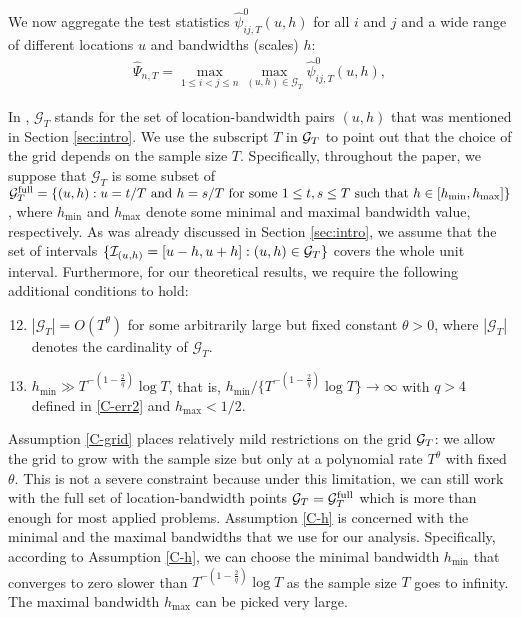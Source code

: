 \documentclass[a4paper,12pt]{article}
\makeatletter
\renewcommand{\eqref}[1]{\tagform@{\ref{#1}}}
\makeatother
\begin{document}
We now aggregate the test statistics $\hat{\psi}^0_{ij, T}(u,h)$ for all $i$ and $j$ and a wide range of different locations $u$ and bandwidths (scales) $h$:
\begin{align}\label{eq:Psi_hat}
	\widehat{\Psi}_{n,T} = \max_{1 \le i < j \le n}\max_{(u,h) \in \mathcal{G}_T} \hat{\psi}^0_{ij,T}(u, h),
\end{align}

In \eqref{eq:Psi_hat}, $\mathcal{G}_T$ stands for the set of location-bandwidth pairs $(u, h)$ that was mentioned in Section \ref{sec:intro}. We use the subscript $T$ in $\mathcal{G}_T$ to point out that the choice of the grid depends on the sample size $T$. Specifically, throughout the paper, we suppose that $\mathcal{G}_T$ is some subset of $\mathcal{G}_T^{\text{full}} = \{ (u,h): u = t/T \text{ and } h = s/T \text{ for some } 1 \le t, s \le T \text{ such that } \linebreak h \in [h_{\min},h_{\max}] \}$, where $h_{\min}$ and $h_{\max}$ denote some minimal and maximal bandwidth value, respectively. As was already discussed in Section \ref{sec:intro}, we assume that the set of intervals $\{\mathcal{I}_{(u, h)} = [u-h, u+h]: (u, h) \in \mathcal{G}_T\}$ covers the whole unit interval. Furthermore, for our theoretical results, we require the following additional conditions to hold:
\begin{enumerate}[label=(C\arabic*),leftmargin=1.05cm]
\setcounter{enumi}{11}

\item \label{C-grid} $|\mathcal{G}_T| = O(T^\theta)$ for some arbitrarily large but fixed constant $\theta > 0$, where $|\mathcal{G}_T|$ denotes the cardinality of $\mathcal{G}_T$. 

\item \label{C-h} $h_{\min} \gg T^{-(1-\frac{2}{q})} \log T$, that is, $h_{\min} / \{ T^{-(1-\frac{2}{q})} \log T \} \rightarrow \infty$ with $q > 4$ defined in \ref{C-err2} and $h_{\max} < 1/2$.

\end{enumerate}
Assumption \ref{C-grid} places relatively mild restrictions on the grid $\mathcal{G}_T$: we allow the grid to grow with the sample size but only at a polynomial rate $T^\theta$ with fixed $\theta$. This is not a severe constraint because under this limitation, we can still work with the full set of location-bandwidth points $\mathcal{G}_T = \mathcal{G}_T^{\text{full}}$ which is more than enough for most applied problems. Assumption \ref{C-h} is concerned with the minimal and the maximal bandwidths that we use for our analysis. Specifically, according to Assumption \ref{C-h}, we can choose the minimal bandwidth $h_{\min}$ that converges to zero slower than $T^{-(1-\frac{2}{q})} \log T$ as the sample size $T$ goes to infinity. The maximal bandwidth $h_{\max}$ can be picked very large.
\end{document}
